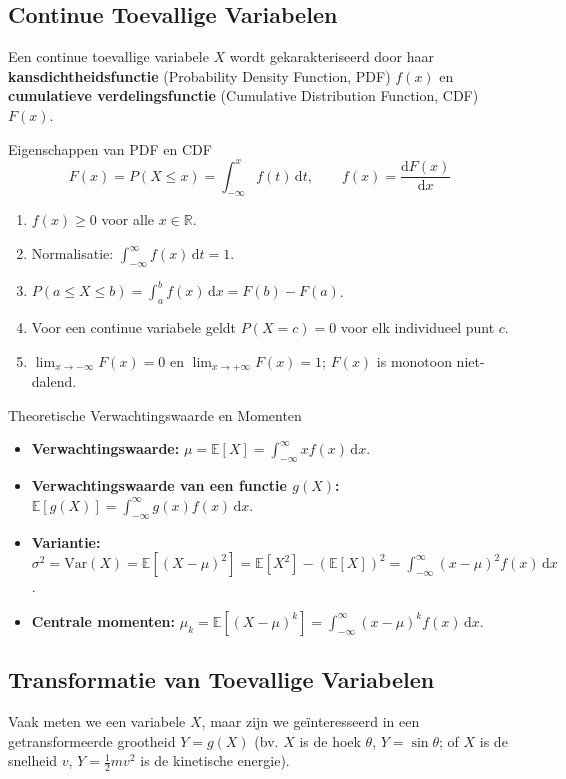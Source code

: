 \documentclass[11pt,a4paper]{article}
\newcommand{\E}{\mathbb{E}}
\newcommand{\Var}{\text{Var}}
\newcommand{\dd}{\mathrm{d}}
\begin{document}
\subsection{Continue Toevallige Variabelen}
Een continue toevallige variabele $X$ wordt gekarakteriseerd door haar \textbf{kansdichtheidsfunctie} (Probability Density Function, PDF) $f(x)$ en \textbf{cumulatieve verdelingsfunctie} (Cumulative Distribution Function, CDF) $F(x)$.

\begin{defbox}{Eigenschappen van PDF en CDF}
\begin{equation}
    F(x) = P(X \le x) = \int_{-\infty}^x f(t) \, \dd t, \qquad f(x) = \frac{\dd F(x)}{\dd x}
\end{equation}
\begin{enumerate}[leftmargin=1.2em]
    \item $f(x) \ge 0$ voor alle $x \in \mathbb{R}$.
    \item Normalisatie: $\int_{-\infty}^\infty f(x) \, \dd t = 1$.
    \item $P(a \le X \le b) = \int_a^b f(x) \, \dd x = F(b) - F(a)$.
    \item Voor een continue variabele geldt $P(X = c) = 0$ voor elk individueel punt $c$.
    \item $\lim_{x \to -\infty} F(x) = 0$ en $\lim_{x \to +\infty} F(x) = 1$; $F(x)$ is monotoon niet-dalend.
\end{enumerate}
\end{defbox}

\begin{defbox}{Theoretische Verwachtingswaarde en Momenten}
\begin{itemize}[leftmargin=1.2em]
    \item \textbf{Verwachtingswaarde:} $\mu = \E[X] = \int_{-\infty}^\infty x f(x) \, \dd x$.
    \item \textbf{Verwachtingswaarde van een functie $g(X)$:} $\E[g(X)] = \int_{-\infty}^\infty g(x) f(x) \, \dd x$.
    \item \textbf{Variantie:} $\sigma^2 = \Var(X) = \E[(X - \mu)^2] = \E[X^2] - (\E[X])^2 = \int_{-\infty}^\infty (x - \mu)^2 f(x) \, \dd x$.
    \item \textbf{Centrale momenten:} $\mu_k = \E[(X - \mu)^k] = \int_{-\infty}^\infty (x - \mu)^k f(x) \, \dd x$.
\end{itemize}
\end{defbox}

\subsection{Transformatie van Toevallige Variabelen}
Vaak meten we een variabele $X$, maar zijn we geïnteresseerd in een getransformeerde grootheid $Y = g(X)$ (bv. $X$ is de hoek $\theta$, $Y = \sin \theta$; of $X$ is de snelheid $v$, $Y = \frac{1}{2}mv^2$ is de kinetische energie).
\end{document}
